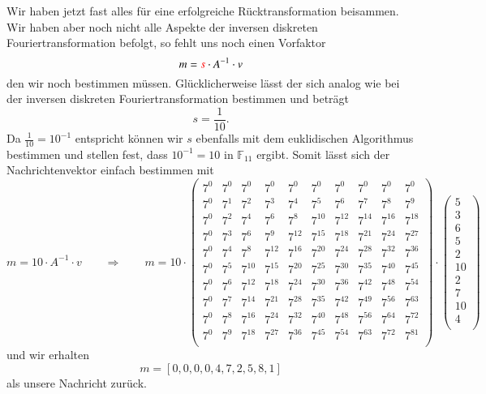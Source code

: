 Wir haben jetzt fast alles für eine erfolgreiche Rücktransformation beisammen. Wir haben aber noch nicht alle Aspekte der inversen diskreten Fouriertransformation befolgt, so fehlt uns noch einen Vorfaktor
\[
m = \textcolor{red}{s} \cdot A^{-1} \cdot v
\]
den wir noch bestimmen müssen. 
Glücklicherweise lässt der sich analog wie bei der inversen diskreten Fouriertransformation bestimmen und beträgt
\[
s = \frac{1}{10}.
\]
Da $\frac{1}{10} = 10^{-1}$ entspricht können wir $s$ ebenfalls mit dem euklidischen Algorithmus bestimmen und stellen fest, dass $10^{-1} = 10$ in $\mathbb{F}_{11}$ ergibt. Somit lässt sich der Nachrichtenvektor einfach bestimmen mit
\[
m = 10 \cdot A^{-1} \cdot v \qquad \Rightarrow \qquad m = 10 \cdot \begin{pmatrix}
	7^0&    7^0&    7^0&    7^0&    7^0&    7^0&    7^0&    7^0&    7^0&    7^0\\
	7^0&	7^1&	7^2&	7^3&	7^4&	7^5&	7^6&	7^7&    7^8&	7^9\\
	7^0&	7^2&	7^4&	7^6&	7^8& 7^{10}& 7^{12}& 7^{14}& 7^{16}& 7^{18}\\
	7^0&	7^3&	7^6&	7^9& 7^{12}& 7^{15}& 7^{18}& 7^{21}& 7^{24}& 7^{27}\\
	7^0&	7^4&	7^8& 7^{12}& 7^{16}& 7^{20}& 7^{24}& 7^{28}& 7^{32}& 7^{36}\\
	7^0&	7^5& 7^{10}& 7^{15}& 7^{20}& 7^{25}& 7^{30}& 7^{35}& 7^{40}& 7^{45}\\
	7^0&	7^6& 7^{12}& 7^{18}& 7^{24}& 7^{30}& 7^{36}& 7^{42}& 7^{48}& 7^{54}\\
	7^0&	7^7& 7^{14}& 7^{21}& 7^{28}& 7^{35}& 7^{42}& 7^{49}& 7^{56}& 7^{63}\\
	7^0&	7^8& 7^{16}& 7^{24}& 7^{32}& 7^{40}& 7^{48}& 7^{56}& 7^{64}& 7^{72}\\
	7^0&	7^9& 7^{18}& 7^{27}& 7^{36}& 7^{45}& 7^{54}& 7^{63}& 7^{72}& 7^{81}\\
\end{pmatrix}
\cdot
\begin{pmatrix}
	5 \\ 3 \\ 6 \\ 5 \\ 2 \\ 10 \\ 2 \\ 7 \\ 10 \\ 4 \\
\end{pmatrix}
\]
und wir erhalten
\[
m = [0,0,0,0,4,7,2,5,8,1]
\]
als unsere Nachricht zurück.
